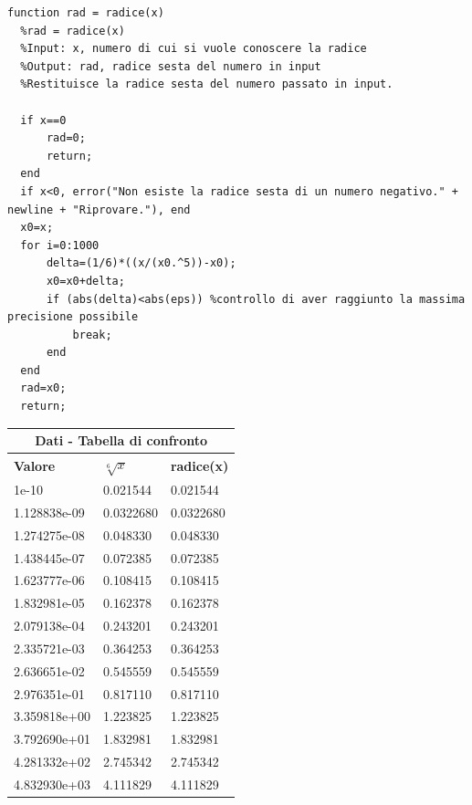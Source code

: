 \documentclass[10pt,a4paper]{article}
\begin{document}
\begin{lstlisting}[style=Matlab-editor]
  function rad = radice(x)
  %rad = radice(x)
  %Input: x, numero di cui si vuole conoscere la radice
  %Output: rad, radice sesta del numero in input
  %Restituisce la radice sesta del numero passato in input.
  
  if x==0
      rad=0;
      return;
  end
  if x<0, error("Non esiste la radice sesta di un numero negativo." + newline + "Riprovare."), end
  x0=x;
  for i=0:1000
      delta=(1/6)*((x/(x0.^5))-x0);
      x0=x0+delta;
      if (abs(delta)<abs(eps)) %controllo di aver raggiunto la massima precisione possibile
          break; 
      end
  end
  rad=x0;
  return;
\end{lstlisting}
\begin{center}
  \begin{tabular}{ |p{2.7cm}||p{2.7cm}|p{2.7cm}| }
    \hline
    \multicolumn{3}{|c|}{ \textbf{Dati - Tabella di confronto}} \\
    \hline
    \textbf{Valore} & $ \sqrt[6]{x} $ & \textbf{radice(x)}      \\
    \hline
    1e-10           & 0.021544        & 0.021544                \\
    1.128838e-09    & 0.0322680       & 0.0322680               \\
    1.274275e-08    & 0.048330        & 0.048330                \\
    1.438445e-07    & 0.072385        & 0.072385                \\
    1.623777e-06    & 0.108415        & 0.108415                \\
    1.832981e-05    & 0.162378        & 0.162378                \\
    2.079138e-04    & 0.243201        & 0.243201                \\
    2.335721e-03    & 0.364253        & 0.364253                \\
    2.636651e-02    & 0.545559        & 0.545559                \\
    2.976351e-01    & 0.817110        & 0.817110                \\
    3.359818e+00    & 1.223825        & 1.223825                \\
    3.792690e+01    & 1.832981        & 1.832981                \\
    4.281332e+02    & 2.745342        & 2.745342                \\
    4.832930e+03    & 4.111829        & 4.111829                \\

\end{tabular}
\end{center}
\end{document}

